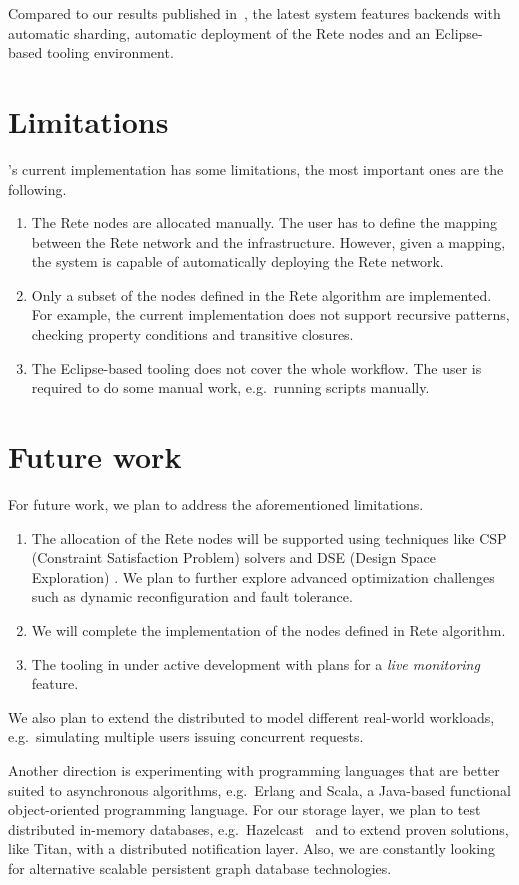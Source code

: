 Compared to our results published in~\cite{Izso:2013:IIG:2487766.2487772}, the latest system features backends with automatic sharding, automatic deployment of the Rete nodes and an Eclipse-based tooling environment.

\section{Limitations}

\iqd{}'s current implementation has some limitations, the most important ones are the following.

\begin{enumerate}
  \item The Rete nodes are allocated manually. The user has to define the mapping between the Rete network and the infrastructure. However, given a mapping, the system is capable of automatically deploying the Rete network.
  \item Only a subset of the nodes defined in the Rete algorithm are implemented. For example, the current implementation does not support recursive patterns, checking property conditions and transitive closures.
  \item The Eclipse-based tooling does not cover the whole workflow. The user is required to do some manual work, e.g.\ running scripts manually.
\end{enumerate}

\section{Future work}
\label{future-work}

For future work, we plan to address the aforementioned limitations.

\begin{enumerate}
  \item The allocation of the Rete nodes will be supported using techniques like CSP (Constraint Satisfaction Problem) solvers and DSE (Design Space Exploration) \cite{DSE11}. We plan to further explore advanced optimization challenges such as dynamic reconfiguration and fault tolerance.
  \item We will complete the implementation of the nodes defined in Rete algorithm.
  \item The tooling in under active development with plans for a \emph{live monitoring} feature.
\end{enumerate}

We also plan to extend the distributed \tb{} to model different real-world workloads, e.g.\ simulating multiple users issuing concurrent requests.

Another direction is experimenting with programming languages that are better suited to asynchronous algorithms, e.g.\ Erlang and Scala, a Java-based functional object-oriented programming language.
For our storage layer, we plan to test distributed in-memory databases, e.g.\ Hazelcast~\cite{Hazelcast} and to extend proven solutions, like Titan, with a distributed notification layer.
Also, we are constantly looking for alternative scalable persistent graph database technologies. 
